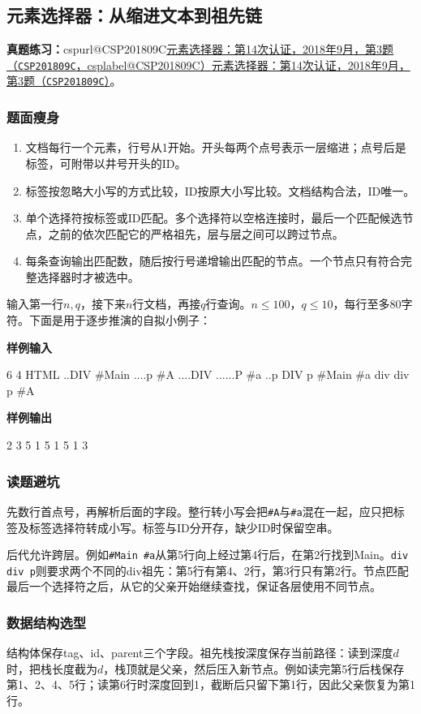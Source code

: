 \documentclass[UTF8,11pt,a4paper,fontset=none]{ctexart}
\makeatletter
\newcommand{\csp}[2]{\ifcsname cspurl@#1\endcsname\href{\csname cspurl@#1\endcsname}{#2（\texttt{#1}，\csname csplabel@#1\endcsname）}\else\href{https://oj.shumeng.tech/p/#1}{#2（\texttt{#1}）}\fi}
\newcommand{\ojpractice}[2]{\par\noindent\textbf{真题练习：}\csp{#1}{#2}。\par}
\makeatother
\begin{document}
\subsection{元素选择器：从缩进文本到祖先链}
\ojpractice{CSP201809C}{元素选择器：第14次认证，2018年9月，第3题}
\subsubsection{题面瘦身}
\begin{enumerate}
\item 文档每行一个元素，行号从1开始。开头每两个点号表示一层缩进；点号后是标签，可附带以井号开头的ID。
\item 标签按忽略大小写的方式比较，ID按原大小写比较。文档结构合法，ID唯一。
\item 单个选择符按标签或ID匹配。多个选择符以空格连接时，最后一个匹配候选节点，之前的依次匹配它的严格祖先，层与层之间可以跨过节点。
\item 每条查询输出匹配数，随后按行号递增输出匹配的节点。一个节点只有符合完整选择器时才被选中。
\end{enumerate}
输入第一行$n,q$，接下来$n$行文档，再接$q$行查询。$n\le100$，$q\le10$，每行至多80字符。下面是用于逐步推演的自拟小例子：
\begin{tcolorbox}[samplebox,title={输入输出样例}]
\textbf{样例输入}
\begin{Sample}
6 4
HTML
..DIV #Main
....p #A
....DIV
......P #a
..p
DIV p
#Main #a
div div p
#A
\end{Sample}
\tcblower
\textbf{样例输出}
\begin{Sample}
2 3 5
1 5
1 5
1 3
\end{Sample}
\end{tcolorbox}

\subsubsection{读题避坑}
先数行首点号，再解析后面的字段。整行转小写会把\texttt{\#A}与\texttt{\#a}混在一起，应只把标签及标签选择符转成小写。标签与ID分开存，缺少ID时保留空串。

后代允许跨层。例如\texttt{\#Main \#a}从第5行向上经过第4行后，在第2行找到Main。\texttt{div div p}则要求两个不同的div祖先：第5行有第4、2行，第3行只有第2行。节点匹配最后一个选择符之后，从它的父亲开始继续查找，保证各层使用不同节点。

\subsubsection{数据结构选型}
结构体保存tag、id、parent三个字段。祖先栈按深度保存当前路径：读到深度$d$时，把栈长度截为$d$，栈顶就是父亲，然后压入新节点。例如读完第5行后栈保存第1、2、4、5行；读第6行时深度回到1，截断后只留下第1行，因此父亲恢复为第1行。
\end{document}
